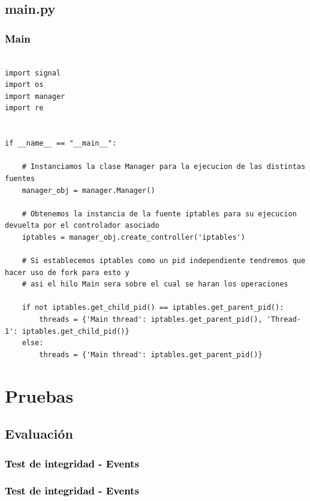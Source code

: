 \documentclass[xcolor=x11names,compress]{beamer}
\theoremstyle{cuadrado}
\begin{document}
\subsection{main.py}

\begin{frame}[fragile]
  \frametitle{\textcolor{black}{Main}}

\begin{lstlisting}[breaklines=true]

import signal
import os
import manager
import re


if __name__ == "__main__":

    # Instanciamos la clase Manager para la ejecucion de las distintas fuentes
    manager_obj = manager.Manager()

    # Obtenemos la instancia de la fuente iptables para su ejecucion devuelta por el controlador asociado
    iptables = manager_obj.create_controller('iptables')

    # Si establecemos iptables como un pid independiente tendremos que hacer uso de fork para esto y
    # asi el hilo Main sera sobre el cual se haran los operaciones

    if not iptables.get_child_pid() == iptables.get_parent_pid():
        threads = {'Main thread': iptables.get_parent_pid(), 'Thread-1': iptables.get_child_pid()}
    else:
        threads = {'Main thread': iptables.get_parent_pid()}

\end{lstlisting}
\end{frame}

\section{Pruebas}

\subsection{Evaluación}

\begin{frame}[fragile]
\frametitle{\textcolor{black}{Test de integridad - Events}}

\hspace*{.75in}{Figura - Test unitario clases del modelo - Events}
\end{frame}

\begin{frame}[fragile]
\frametitle{\textcolor{black}{Test de integridad - Events}}

\hspace*{.75in}{Figura - Método de la clase Test test\_events\_timestamp}
\end{frame}
\end{document}
